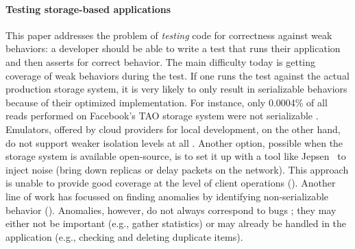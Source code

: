 \paragraph{Testing storage-based applications}
This paper addresses the problem of \textit{testing} code for correctness
against weak behaviors: a developer should be able to write a test that runs
their application and then asserts for correct behavior. 
The main difficulty today is getting coverage of weak behaviors during
the test. If one runs the test
against the actual production storage system, it is very likely to only result in
serializable behaviors because of their optimized implementation. For
instance, only 0.0004\% of all reads performed on Facebook's TAO storage system 
were not serializable \cite{facebook-consistency}. 
Emulators, offered by cloud providers for local development, on the other hand, do not support weaker
isolation levels at all \cite{cosmosdb-local}. Another option, possible when
the storage system is available open-source, is to set it up with a 
tool like Jepsen~\cite{jepsen} to inject noise (bring down replicas or
delay packets on the network). 
This approach is unable to provide good coverage at the level of client operations
\cite{clotho} (). Another line of work has focussed on finding
anomalies by identifying non-serializable behavior (). Anomalies, however, do not
always correspond to bugs \cite{DBLP:conf/pldi/BrutschyD0V18,isodiff}; they may
either not be important (e.g., gather statistics) or may already be handled in
the application (e.g., checking and deleting duplicate items).



%


